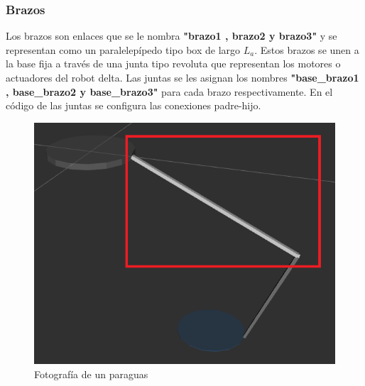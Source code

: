       \newpage

       \subsubsection{Brazos}
        Los brazos son enlaces que se le nombra \textbf{"brazo1 , brazo2 y brazo3"} y se representan como un paralelepípedo tipo box de largo \textbf{$L_a$}. Estos brazos se unen a la base fija a través de una junta tipo revoluta que representan los motores o actuadores del robot delta. Las juntas se les asignan los nombres \textbf{"base\_brazo1 , base\_brazo2 y base\_brazo3"} para cada brazo respectivamente. En el código de las juntas se configura las conexiones padre-hijo.
        
        
             \begin{figure}[h]
                \centering
                \includegraphics[width=0.4\linewidth]{Main/Chapter6/Images6/cap6_brazo.png}
                \caption{Fotografía de un paraguas}
                \label{f:Cap6_urdf_2}
            \end{figure}  
            

